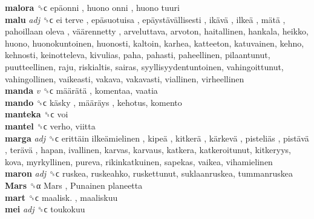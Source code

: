 \textbf{malora} ␝ϲ   epäonni ,  huono onni ,  huono tuuri   \\
\textbf{malu} \emph{adj}  ␝ϲ   ei terve ,  epäsuotuisa ,  epäystävällisesti ,  ikävä ,  ilkeä ,  mätä ,  pahoillaan oleva ,  väärennetty , arveluttava, arvoton, haitallinen, hankala, heikko, huono, huonokuntoinen, huonosti, kaltoin, karhea, katteeton, katuvainen, kehno, kehnosti, keinotteleva, kivulias, paha, pahasti, paheellinen, pilaantunut, puutteellinen, raju, riskialtis, sairas, syyllisyydentuntoinen, vahingoittunut, vahingollinen, vaikeasti, vakava, vakavasti, viallinen, virheellinen  \\
\textbf{manda} \emph{v}  ␝ϲ   määrätä , komentaa, vaatia  \\
\textbf{mando} ␝ϲ   käsky ,  määräys , kehotus, komento  \\
\textbf{manteka} ␝ϲ  voi  \\
\textbf{mantel} ␝ϲ  verho, viitta  \\
\textbf{marga} \emph{adj}  ␝ϲ   erittäin ilkeämielinen ,  kipeä ,  kitkerä ,  kärkevä ,  pisteliäs ,  pistävä ,  terävä , hapan, ivallinen, karvas, karvaus, katkera, katkeroitunut, kitkeryys, kova, myrkyllinen, pureva, rikinkatkuinen, sapekas, vaikea, vihamielinen  \\
\textbf{maron} \emph{adj}  ␝ϲ  ruskea, ruskeahko, ruskettunut, suklaanruskea, tummanruskea  \\
\textbf{Mars} ␝α   Mars ,  Punainen planeetta   \\
\textbf{mart} ␝ϲ   maalisk. , maaliskuu  \\
\textbf{mei} \emph{adj}  ␝ϲ  toukokuu  \\
